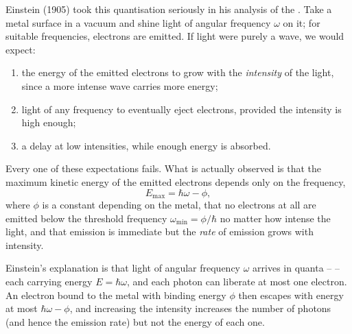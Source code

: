 Einstein (1905) took this quantisation seriously in his analysis of the . Take a metal surface in a vacuum and shine light of angular frequency $\omega$ on it; for suitable frequencies, electrons are emitted. If light were purely a wave, we would expect:
\begin{enumerate}[label=(\roman*)]
    \item the energy of the emitted electrons to grow with the \emph{intensity} of the light, since a more intense wave carries more energy;
    \item light of any frequency to eventually eject electrons, provided the intensity is high enough;
    \item a delay at low intensities, while enough energy is absorbed.
\end{enumerate}
Every one of these expectations fails. What is actually observed is that the maximum kinetic energy of the emitted electrons depends only on the frequency,
$$
E_{\max} = \hbar \omega - \phi,
$$
where $\phi$ is a constant depending on the metal, that no electrons at all are emitted below the threshold frequency $\omega_{\min} = \phi/\hbar$ no matter how intense the light, and that emission is immediate but the \emph{rate} of emission grows with intensity.

\begin{center}
\end{center}

Einstein's explanation is that light of angular frequency $\omega$ arrives in quanta --  -- each carrying energy $E = \hbar \omega$, and each photon can liberate at most one electron. An electron bound to the metal with binding energy $\phi$ then escapes with energy at most $\hbar \omega - \phi$, and increasing the intensity increases the number of photons (and hence the emission rate) but not the energy of each one.

